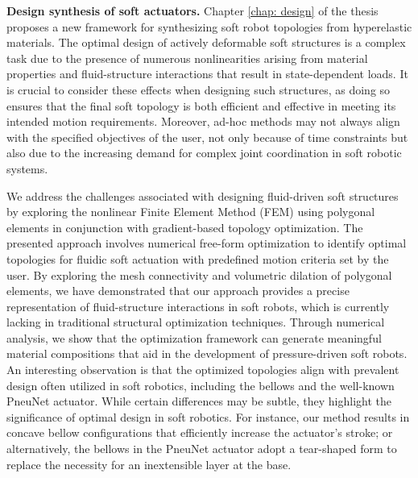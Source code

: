 

\textbf{Design synthesis of soft actuators. } Chapter \ref{chap: design} of the thesis proposes a new framework for synthesizing soft robot topologies from hyperelastic materials. The optimal design of actively deformable soft structures is a complex task due to the presence of numerous nonlinearities arising from material properties and fluid-structure interactions that result in state-dependent loads. It is crucial to consider these effects when designing such structures, as doing so ensures that the final soft topology is both efficient and effective in meeting its intended motion requirements. Moreover, ad-hoc methods may not always align with the specified objectives of the user, not only because of time constraints but also due to the increasing demand for complex joint coordination in soft robotic systems.

We address the challenges associated with designing fluid-driven soft structures by exploring the nonlinear Finite Element Method (FEM) using polygonal elements in conjunction with gradient-based topology optimization. The presented approach involves numerical free-form optimization to identify optimal topologies for fluidic soft actuation with predefined motion criteria set by the user. By exploring the mesh connectivity and volumetric dilation of polygonal elements, we have demonstrated that our approach provides a precise representation of fluid-structure interactions in soft robots, which is currently lacking in traditional structural optimization techniques. Through numerical analysis, we show that the optimization framework can generate meaningful material compositions that aid in the development of pressure-driven soft robots. An interesting observation is that the optimized topologies align with prevalent design often utilized in soft robotics, including the bellows and the well-known PneuNet actuator. While certain differences may be subtle, they highlight the significance of optimal design in soft robotics. For instance, our method results in concave bellow configurations that efficiently increase the actuator's stroke; or alternatively, the bellows in the PneuNet actuator adopt a tear-shaped form to replace the necessity for an inextensible layer at the base.


